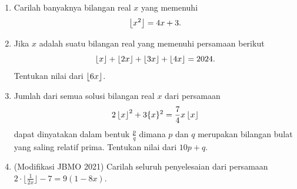 \documentclass[12pt]{scrartcl}
\begin{document}
\begin{enumerate}
    \item Carilah banyaknya bilangan real $x$ yang memenuhi
    $$\left\lfloor x^2 \right\rfloor=4x+3.$$

    \item Jika $x$ adalah suatu bilangan real yang memenuhi persamaan berikut
    $$\left\lfloor x \right\rfloor+\left\lfloor 2x \right\rfloor+\left\lfloor 3x \right\rfloor+\left\lfloor 4x \right\rfloor=2024.$$
    Tentukan nilai dari $\left\lfloor 6x \right\rfloor$.

    \item Jumlah dari semua solusi bilangan real $x$ dari persamaan
    $$2\left\lfloor x \right\rfloor^2+3\{x\}^2=\frac{7}{4}x\left\lfloor x \right\rfloor$$
    dapat dinyatakan dalam bentuk $\frac{p}{q}$ dimana $p$ dan $q$ merupakan bilangan bulat yang saling relatif prima. Tentukan nilai dari $10p+q$.

    
    \item (Modifikasi JBMO 2021) Carilah seluruh penyelesaian dari persamaan $2\cdot \lfloor{\frac{1}{2x}}\rfloor - 7 = 9(1 - 8x)$.
\end{enumerate}
\end{document}
